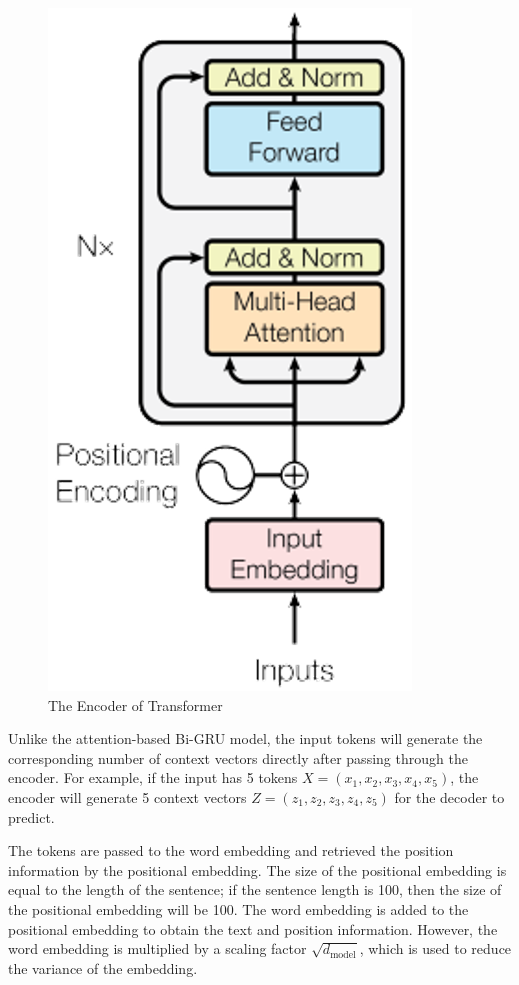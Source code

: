 \begin{figure}[h]
	\centering
	\includegraphics[scale=0.7]{../images/transformer-encoder.png}
    \caption{The Encoder of Transformer}
	\label{fig:transformer_encoder}
\end{figure}

Unlike the attention-based Bi-GRU model, the input tokens will generate the corresponding number of context vectors directly after passing through the encoder. For example, if the input has 5 tokens $X = (x_1, x_2, x_3, x_4, x_5)$, the encoder will generate 5 context vectors $Z = (z_1, z_2, z_3, z_4, z_5)$ for the decoder to predict.

The tokens are passed to the word embedding and retrieved the position information by the positional embedding. The size of the positional embedding is equal to the length of the sentence; if the sentence length is 100, then the size of the positional embedding will be 100. The word embedding is added to the positional embedding to obtain the text and position information. However, the word embedding is multiplied by a scaling factor $\sqrt{d_\text{model}}$, which is used to reduce the variance of the embedding.

